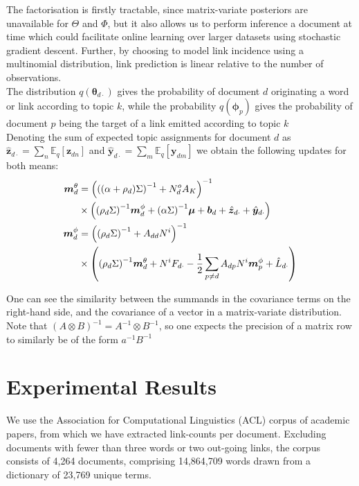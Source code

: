 \documentclass{sciposter}
\newcommand \ex[2] {
    \mathbb{E}_{ { #2 } }\left[ #1 \right]
}
\newcommand \halve[1] {
	\frac{#1}{2}
}
\newcommand \half {
    \halve{1}
}
\newcommand \vv[1] { \bm #1 }
\newcommand \inv[1] { {#1}^{-1} }
\newcommand \invb[1] { \inv{\left( #1 \right)} }
\newcommand \thdo { { \vv{\theta}_{d\cdot} } }
\begin{document}
\begin{multicols}{3}
The factorisation is firstly tractable, since matrix-variate posteriors are unavailable for $\Theta$ and $\Phi$, but it also allows us to perform inference a document at time which could facilitate online learning over larger datasets using stochastic gradient descent. Further, by choosing to model link incidence using a multinomial distribution, link prediction is linear relative to the number of observations.  \\

The distribution $q(\thdo)$ gives the probability of document $d$ originating a word or link according to topic $k$, while the probability $q(\vv{\phi}_p)$ gives the probability of document $p$ being the target of a link emitted according to topic $k$\\

Denoting the sum of expected topic assignments for document $d$ as $\hat{\vv{z}}_{d\cdot} = \sum_n \ex{\vv{z}_{dn}}{q}$ and $\hat{\vv{y}}_{d\cdot} = \sum_m \ex{\vv{y}_{dm}}{q}$ we obtain the following updates for both means:
\begin{align*}
\mtd &= \invb{ \invb{(\alpha + \rho_d)\Sigma} + N^o_d A_K } \\
    & \times
            \left(
                \invb{\rho_d \Sigma} \mpd
                + \invb{\alpha \Sigma}\vv{\mu}
                + \vv{b}_d 
                + \hat{\vv{z}}_{d\cdot}
                + \hat{\vv{y}}_{d\cdot}
            \right) \\
 \mpd & = \invb{\invb{\rho_d \Sigma} + A_{dd}N^i} \\
  & \times
             \left(
                 \invb{\rho_d \Sigma}\mtd + N^i F_{d\cdot} -\half \sum_{p \neq d} A_{dp} N^i \vv{m}^\phi_p + \hat{L}_{d\cdot}
             \right)
 \end{align*}
 
One can see the similarity between the summands in the covariance terms on the right-hand side, and the covariance of a vector in a matrix-variate distribution. Note that $\invb{A\otimes B} = \inv{A} \otimes \inv{B}$, so one expects the precision of a matrix row to similarly be of the form $\inv{a}\inv{B}$

\section{Experimental Results}

We use the Association for Computational Linguistics (ACL) corpus of academic papers, from which we have extracted link-counts per document. Excluding documents with fewer than three words or two out-going links, the corpus consists of 4,264 documents, comprising 14,864,709 words drawn from a dictionary of 23,769 unique terms. 


\end{multicols}
\end{document}
